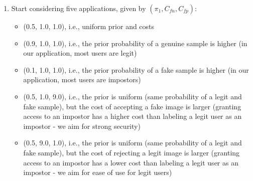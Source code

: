 \documentclass[a4paper, 12pt, english]{article}
\begin{document}
    \begin{enumerate}
        \item Start considering five applications, given by \((\pi_1,C_{fn},C_{fp})\):
        \begin{itemize}

            \item (0.5, 1.0, 1.0), i.e., uniform prior and costs
            \item (0.9, 1.0, 1.0), i.e., the prior probability of a genuine sample is higher (in our application, most users are legit)
            \item (0.1, 1.0, 1.0), i.e., the prior probability of a fake sample is higher (in our application, most users are impostors)
            \item (0.5, 1.0, 9.0), i.e., the prior is uniform (same probability of a legit and fake sample), but the cost of accepting a fake image is larger (granting access to an impostor has a higher cost than labeling a legit user as an impostor - we aim for strong security)
            \item (0.5, 9.0, 1.0), i.e., the prior is uniform (same probability of a legit and fake sample), but the cost of rejecting a legit image is larger (granting access to an impostor has a lower cost than labeling a legit user as an impostor - we aim for ease of use for legit users)


\end{itemize}
\end{enumerate}
\end{document}
